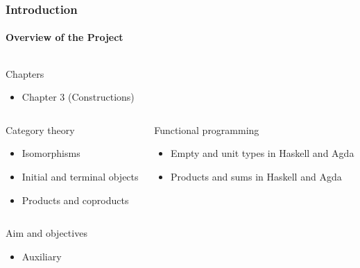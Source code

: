\documentclass{beamer}
\begin{document}

\begin{frame}[label={chap:constructions}]
  \frametitle{Introduction}
  \framesubtitle{Overview of the Project}

  \begin{columns}[onlytextwidth,t]
    \begin{column}{\textwidth}
      \begin{block}{Chapters}
        \begin{itemize}
        \item Chapter 3 (Constructions)
        \end{itemize}
      \end{block}
    \end{column}
  \end{columns}
  \begin{columns}[onlytextwidth,t]
    \begin{column}{.5\textwidth}
      \begin{block}{Category theory}
        \begin{itemize}
        \item Isomorphisms
        \item Initial and terminal objects
        \item Products and coproducts
        \end{itemize}
      \end{block}
    \end{column}
    \begin{column}{.5\textwidth}
      \begin{block}{Functional programming}
        \begin{itemize}
        \item Empty and unit types in Haskell and Agda
        \item Products and sums in Haskell and Agda
        \end{itemize}
      \end{block}
    \end{column}
  \end{columns}
  \begin{columns}[onlytextwidth,t]
    \begin{column}{\textwidth}
      \begin{block}{Aim and objectives}
        \begin{itemize}
        \item Auxiliary
        \end{itemize}
      \end{block}
    \end{column}
  \end{columns}

\end{frame}
\end{document}

